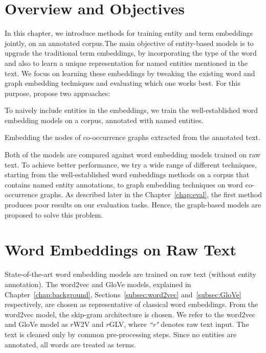 \section{Overview and Objectives}\label{sec:entity_overview}
In this chapter, we introduce methods for training entity and term embeddings jointly, on an annotated corpus.The main objective of entity-based models is to upgrade the traditional term embeddings, by incorporating the type of the word and also to learn a unique representation for named entities mentioned in the text. We focus on learning these embeddings by tweaking the existing word and graph embedding techniques and evaluating which one works best. For this purpose, propose two approaches: 
\begin{compactenum}
\item To naively include entities in the embeddings, we train the well-established word embedding models on a corpus, annotated with named entities. 
\item Embedding the nodes of co-occurrence graphs extracted from the annotated text. 
\end{compactenum}
Both of the models are compared against word embedding models trained on raw text. To achieve better performance, we try a wide range of different techniques, starting from the well-established word embeddings methods on a corpus that contains named entity annotations, to graph embedding techniques on word co-occurrence graphs. As described later in the Chapter~\ref{chap:eval}, the first method produces poor results on our evaluation tasks. Hence, the graph-based models are proposed to solve this problem. 
\section{Word Embeddings on Raw Text}\label{sec:raw}
State-of-the-art word embedding models are trained on raw text (without entity annotation). The word2vec and GloVe models, explained in Chapter~\ref{chap:background}, Sections~\ref{subsec:word2vec} and~\ref{subsec:GloVe} respectively, are chosen as representative of classical word embeddings. From the word2vec model, the skip-gram architecture is chosen. We refer to the word2vec and GloVe model as $r$W2V and  $r$GLV, where \emph{``r"} denotes raw text input. The text is cleaned only by common pre-processing steps.  Since no entities are annotated, all words are treated as terms. 
